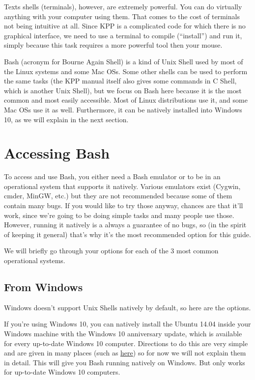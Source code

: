 \documentclass[letterpaper,10pt,openany,oneside]{sphinxmanual}
\begin{document}
Texts shells (terminals), however, are extremely powerful. You can do virtually
anything with your computer using them. That comes to the cost of terminals not
being intuitive at all. Since KPP is a complicated code for which there is no
graphical interface, we need to use a terminal to compile (``install'') and run
it, simply because this task requires a more powerful tool then your mouse.

Bash (acronym for Bourne Again Shell) is a kind of Unix Shell used by most of
the Linux systems and some Mac OSs. Some other shells can be used to perform
the same tasks (the KPP manual itself also gives some commands in C Shell,
which is another Unix Shell), but we focus on Bash here because it is the most
common and most easily accessible.  Most of Linux distributions use it, and
some Mac OSs use it as well. Furthermore, it can be natively installed into
Windows 10, as we will explain in the next section.


\section{Accessing Bash}
\label{bash:accessing-bash}
To access and use Bash, you either need a Bash emulator or to be in an
operational system that supports it natively. Various emulators exist (Cygwin,
cmder, MinGW, etc.) but they are not recommended because some of them contain
many bugs. If you would like to try those anyway, chances are that it'll work,
since we're going to be doing simple tasks and many people use those. However,
running it natively is a always a guarantee of no bugs, so (in the spirit of
keeping it general) that's why it's the most recommended option for this guide.

We will briefly go through your options for each of the 3 most common
operational systems.


\subsection{From Windows}
\label{bash:from-windows}
Windows doesn't support Unix Shells natively by default, so here are the
options.

If you're using Windows 10, you can natively install the Ubuntu 14.04 inside
your Windows machine with the Windows 10 anniversary update, which is available
for every up-to-date Windows 10 computer. Directions to do this are very simple
and are given in many places (such as \href{http://www.howtogeek.com/249966/how-to-install-and-use-the-linux-bash-shell-on-windows-10/}{here})
so for now we will not explain them in detail. This will give you Bash running
natively on Windows. But only works for up-to-date Windows 10 computers.
\end{document}

